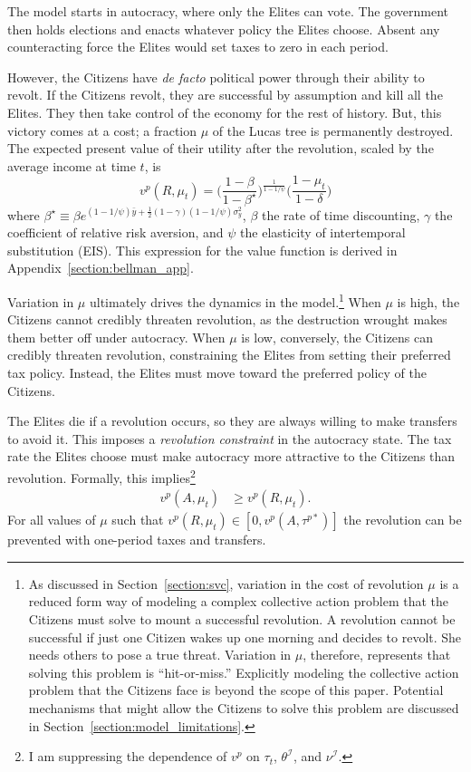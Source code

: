 The model starts in autocracy,  where only the Elites can vote.  The government then holds elections and enacts whatever policy the Elites choose.  Absent any counteracting force the Elites would set taxes to zero in each period. 

However, the Citizens have \textit{de facto} political power through their ability to revolt. If the Citizens revolt, they are successful by assumption and kill all the Elites. They then take control of the economy for the rest of history. But, this victory comes at a cost; a fraction $\mu$ of the Lucas tree is permanently destroyed. The expected present value of their utility after the revolution, scaled by the average income at time $t$, is
\begin{equation}
v^{p}(R,\mu_{t})=\bigg(\frac{1-\beta}{1-\beta^{\star}}\bigg)^{\frac{1}{1-1/\psi}}\bigg(\frac{1-\mu_t}{1-\delta}\bigg)\label{eq:revolution}
\end{equation}
where  $\beta^{\star} \equiv \beta e^{(1-1/\psi)\bar{y}+\frac{1}{2}(1-\gamma)(1-1/\psi)\sigma_{y}^{2}}$, $\beta$ the rate of time discounting, $\gamma$ the coefficient of relative risk aversion, and $\psi$ the  elasticity of intertemporal substitution (EIS). This expression for the value function is derived in Appendix~\ref{section:bellman_app}.

Variation in $\mu$ ultimately drives the dynamics in the model.\footnote{As discussed in Section~\ref{section:svc}, variation in the cost of revolution $\mu$ is a reduced form way of modeling a complex collective action problem that the Citizens must solve to mount a successful revolution. A revolution cannot be successful if just one Citizen wakes up one morning and decides to revolt. She needs others to pose a true threat. Variation in $\mu$, therefore, represents that solving this problem is ``hit-or-miss.'' Explicitly modeling the collective action problem that the Citizens face is beyond the scope of this paper.  Potential mechanisms that might allow the Citizens to solve this problem are discussed in Section~\ref{section:model_limitations}.} When $\mu$ is high, the Citizens cannot credibly threaten revolution, as the destruction wrought makes them better off under autocracy. When $\mu$ is low, conversely, the Citizens can credibly threaten revolution, constraining the Elites from setting their preferred tax policy. Instead, the Elites must move toward the preferred policy of the Citizens.

The Elites die if a revolution occurs, so they are always willing to make transfers to avoid it. This imposes a \textit{revolution constraint} in the autocracy state. The tax rate the Elites choose  must make autocracy more attractive to the Citizens than revolution. Formally, this implies\footnote{I am suppressing the dependence of $v^p$ on $\tau_t$, $\theta^\mathcal{I}$, and $\nu^\mathcal{I}$.}
\begin{align}
v^{p}(A, \mu_{t}) & \geq v^p(R,\mu_{t}).\label{eq:constraint}
\end{align}
For all values of $\mu$ such that $v^p(R,\mu_{t}) \in [0,v^{p}(A, \tau^{p*})]$ the revolution can be prevented with one-period taxes and transfers.

